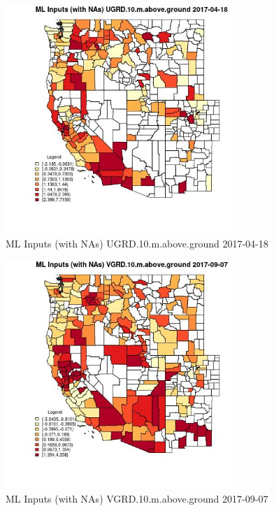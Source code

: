 \begin{figure} 
\centering  
\includegraphics[width=0.77\textwidth]{Code_Outputs/Report_ML_input_PM25_Step4_part_e_de_duplicated_aves_compiled_2019-05-20wNAs_CountyUGRD10mabovegroundMean2017-04-18.jpg} 
\caption{\label{fig:Report_ML_input_PM25_Step4_part_e_de_duplicated_aves_compiled_2019-05-20wNAsCountyUGRD10mabovegroundMean2017-04-18}ML Inputs (with NAs) UGRD.10.m.above.ground 2017-04-18} 
\end{figure} 
 

\begin{figure} 
\centering  
\includegraphics[width=0.77\textwidth]{Code_Outputs/Report_ML_input_PM25_Step4_part_e_de_duplicated_aves_compiled_2019-05-20wNAs_CountyVGRD10mabovegroundMean2017-09-07.jpg} 
\caption{\label{fig:Report_ML_input_PM25_Step4_part_e_de_duplicated_aves_compiled_2019-05-20wNAsCountyVGRD10mabovegroundMean2017-09-07}ML Inputs (with NAs) VGRD.10.m.above.ground 2017-09-07} 
\end{figure} 
 

